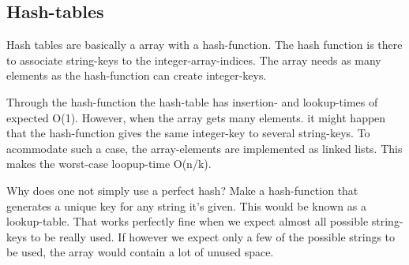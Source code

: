 \subsection{Hash-tables}

Hash tables are basically a array with a hash-function. The hash function is there to associate string-keys to the integer-array-indices. The array needs as many elements as the hash-function can create integer-keys.

Through the hash-function the hash-table has insertion- and lookup-times of expected O(1). However, when the array gets many elements. it might happen that the hash-function gives the same integer-key to several string-keys. To acommodate such a case, the array-elements are implemented as linked lists. This makes the worst-case loopup-time O(n/k).


Why does one not simply use a perfect hash? Make a hash-function that generates a unique key for any string it's given. This would be known as a lookup-table. That works perfectly fine when we expect almost all possible string-keys to be really used. If however we  expect only a few of the possible strings to be used, the array would contain a lot of unused space.
